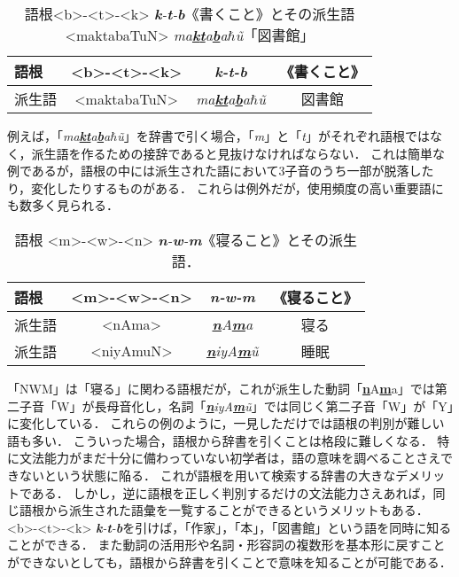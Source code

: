 \documentclass[technicalreport]{ieicej}
\begin{document}
\begin{table}[ht]
\begin{center}
\begin{tabular}{l|ccc}
   語根 & <b>-<t>-<k> &\textit{\textbf{k}-\textbf{t}-\textbf{b}}& 《書くこと》\\
  \hline
 派生語 & <maktabaTuN>&\textit{ma\underline{\textbf{k}}\underline{\textbf{t}}a\underline{\textbf{b}}a$\hbar$\~u} & 図書館\\
\hline
\end{tabular}
\caption{語根<b>-<t>-<k> \textit{\textbf{k}-\textbf{t}-\textbf{b}}《書くこと》とその派生語<maktabaTuN> \textit{ma\underline{\textbf{k}}\underline{\textbf{t}}a\underline{\textbf{b}}a$\hbar$\~u}「図書館」}
\label{table:alignment}
\end{center}
\end{table}

例えば，「\textit{ma\underline{\textbf{k}}\underline{\textbf{t}}a\underline{\textbf{b}}a$\hbar$\~u}」を辞書で引く場合，「\textit{m}」と「\textit{t}」がそれぞれ語根ではなく，派生語を作るための接辞であると見抜けなければならない．
これは簡単な例であるが，語根の中には派生された語において3子音のうち一部が脱落したり，変化したりするものがある．
これらは例外だが，使用頻度の高い重要語にも数多く見られる．

\begin{table}[ht]
\begin{center}
\begin{tabular}{l|ccc}
   語根 & <m>-<w>-<n>&\textit{\textbf{n}-\textbf{w}-\textbf{m}} & 《寝ること》\\
  \hline
 派生語& <nAma>&\textit{\underline{\textbf{n}}A\underline{\textbf{m}}a} & 寝る\footnotemark\\
  派生語& <niyAmuN>&\textit{\underline{\textbf{n}}iyA\underline{\textbf{m}}\~u} & 睡眠\\
\hline
\end{tabular}
\caption{語根 <m>-<w>-<n> \textit{\textbf{n}-\textbf{w}-\textbf{m}}《寝ること》とその派生語．}

\label{table:alignment}
\end{center}
\end{table}
「NWM」は「寝る」に関わる語根だが，これが派生した動詞「{\underline{\textbf{n}}A\underline{\textbf{m}}a}」では第二子音「W」が長母音化し，名詞「\textit{\underline{\textbf{n}}iyA\underline{\textbf{m}}\~u}」では同じく第二子音「W」が「Y」に変化している．
これらの例のように，一見しただけでは語根の判別が難しい語も多い．
こういった場合，語根から辞書を引くことは格段に難しくなる．
特に文法能力がまだ十分に備わっていない初学者は，語の意味を調べることさえできないという状態に陥る．
これが語根を用いて検索する辞書の大きなデメリットである．
しかし，逆に語根を正しく判別するだけの文法能力さえあれば，同じ語根から派生された語彙を一覧することができるというメリットもある．
<b>-<t>-<k> \textit{\textbf{k}-\textbf{t}-\textbf{b}}を引けば，「作家」，「本」，「図書館」という語を同時に知ることができる．
また動詞の活用形や名詞・形容詞の複数形を基本形に戻すことができないとしても，語根から辞書を引くことで意味を知ることが可能である．
\end{document}
